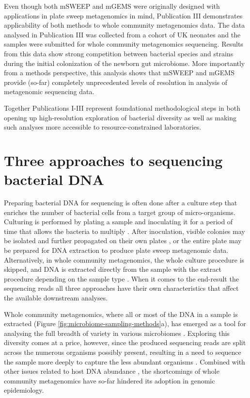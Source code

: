 \documentclass[officiallayout]{tktla}
\begin{document}
Even though both mSWEEP and mGEMS were originally designed with
applications in plate sweep metagenomics in mind, Publication III
\citep{maklin_strong_2022} demonstrates applicability of both methods
to whole community metagenomics data. The data analysed in Publication
III was collected from a cohort of UK neonates
\citep{shao2019stunted} and the samples were submitted for whole community metagenomics sequencing. Results from this data show strong
competition between bacterial species and strains during the initial
colonization of the newborn gut microbiome. More importantly from a
methods perspective, this analysis shows that mSWEEP and mGEMS provide
(so-far) completely unprecedented levels of resolution in analysis of
metagenomic sequencing data.

Together Publications I-III represent foundational
methodological steps in both opening up high-resolution exploration of
bacterial diversity as well as making such analyses more accessible to
resource-constrained laboratories.

\section{Three approaches to sequencing bacterial DNA}
\label{three-approaches-to-metagenomics}


Preparing bacterial DNA for sequencing is often done after a culture
step that enriches the number of bacterial cells from a target group
of micro-organisms. Culturing is performed by plating a sample and
inoculating it for a period of time that allows the bacteria to
multiply \citep{sanders2012aseptic}. After inoculation, visible
colonies may be isolated and further propagated on their own plates
\citep{sanders2012aseptic}, or the entire plate may be prepared for DNA
extraction to produce plate sweep metagenomic data. Alternatively, in
whole community metagenomics, the whole culture procedure is skipped, and DNA is
extracted directly from the sample with the extract procedure
depending on the sample type \citep{bachmann2018advances}. When it
comes to the end-result \textemdash{ } the sequencing reads
\textemdash{ } all three approaches have their own characteristics
that affect the available downstream analyses.

Whole community metagenomics, where all or most of the DNA in a sample is
extracted (Figure \ref{fig:microbiome-sampling-methods}a), has emerged
as a tool for analysing the full breadth of variety in various
microbiomes \citep{shao2019stunted, ghensi2020strong,
  bertrand2019hybrid, danko2021global, whelan2020culture}. Exploring
this diversity comes at a price, however, since the produced
sequencing reads are split across the numerous organisms possibly
present, resulting in a need to sequence the sample more deeply to
capture the less abundant organisms \citep{whelan2020culture,
  vollmers2017comparing, quince2017shotgun}. Combined with other
issues related to host DNA abundance \citep{whelan2020culture, ivy2018direct, gu2019clinical}, the shortcomings of whole community metagenomics have
so-far hindered its adoption in genomic epidemiology.
\end{document}
